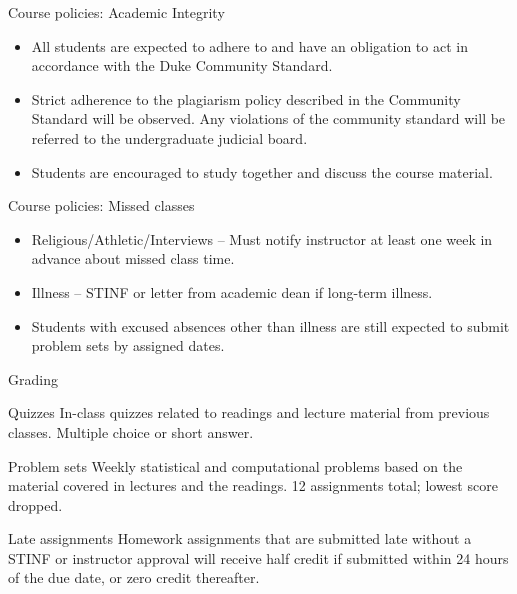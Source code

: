 \documentclass[presentation]{beamer}
\begin{document}
\begin{frame}[label={sec:orgheadline8}]{Course policies: Academic Integrity}
\begin{itemize}
\item All students are expected to adhere to and have an obligation to act in accordance with the Duke Community Standard.

\item Strict adherence to the plagiarism policy described in the Community Standard will be observed. Any violations of the community standard will be referred to the undergraduate judicial board.

\item Students are encouraged to study together and discuss the course material.
\end{itemize}
\end{frame}


\begin{frame}[label={sec:orgheadline9}]{Course policies: Missed classes}
\begin{itemize}
\item Religious/Athletic/Interviews -- Must notify instructor at least \alert{one week} in advance about missed class time.

\item Illness -- STINF or letter from academic dean if long-term illness.

\item Students with excused absences other than illness are still expected to submit problem sets by assigned dates.
\end{itemize}
\end{frame}

\begin{frame}[label={sec:orgheadline10}]{Grading}
\begin{block}{Quizzes}
In-class quizzes related to readings and lecture material from previous classes. Multiple choice or short answer.
\end{block}

\begin{block}{Problem sets}
Weekly statistical and computational problems based on the material covered in lectures and the readings. 12 assignments total; lowest score dropped.
\end{block}

\begin{block}{Late assignments}
Homework assignments that are submitted late without a STINF or instructor approval will receive half credit if submitted within 24 hours of the due date, or zero credit thereafter.
\end{block}
\end{frame}
\end{document}
